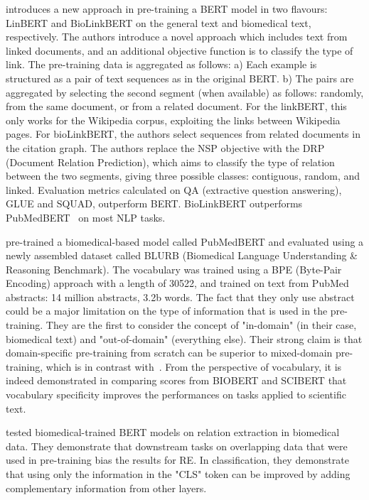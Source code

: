 \cite{yasunaga2020linkbert} introduces a new approach in pre-training a BERT model in two flavours: LinBERT and BioLinkBERT on the general text and biomedical text, respectively.
The authors introduce a novel approach which includes text from linked documents, and an additional objective function is to classify the type of link.
The pre-training data is aggregated as follows: a) Each example is structured as a pair of text sequences as in the original BERT. b) The pairs are aggregated by selecting the second segment (when available) as follows: randomly, from the same document, or from a related document. For the linkBERT, this only works for the Wikipedia corpus, exploiting the links between Wikipedia pages. For bioLinkBERT, the authors select sequences from related documents in the citation graph. 
The authors replace the NSP objective with the DRP (Document Relation Prediction), which aims to classify the type of relation between the two segments, giving three possible classes: contiguous, random, and linked.  
Evaluation metrics calculated on QA (extractive question answering), GLUE and SQUAD, outperform BERT. BioLinkBERT outperforms PubMedBERT~\cite{gu2020pubmedbert} on most NLP tasks. 

\cite{gu2020pubmedbert} pre-trained a biomedical-based model called PubMedBERT and evaluated using a newly assembled dataset called BLURB (Biomedical Language Understanding \& Reasoning Benchmark). 
The vocabulary was trained using a BPE (Byte-Pair Encoding) approach with a length of 30522, and trained on text from PubMed abstracts: 14 million abstracts, 3.2b words. 
The fact that they only use abstract could be a major limitation on the type of information that is used in the pre-training. 
They are the first to consider the concept of "in-domain" (in their case, biomedical text) and "out-of-domain" (everything else). 
Their strong claim is that domain-specific pre-training from scratch can be superior to mixed-domain pre-training, which is in contrast with~\cite{hong2022ScholarBERT}. 
From the perspective of vocabulary, it is indeed demonstrated in comparing scores from BIOBERT and SCIBERT that vocabulary specificity improves the performances on tasks applied to scientific text. 

\cite{su2022investigation} tested biomedical-trained BERT models on relation extraction in biomedical data. They demonstrate that downstream tasks on overlapping data that were used in pre-training bias the results for RE. In classification, they demonstrate that using only the information in the "CLS" token can be improved by adding complementary information from other layers. 

